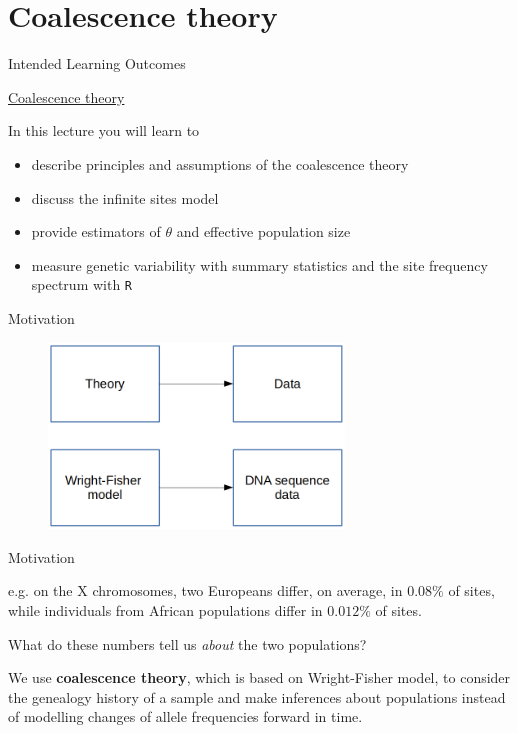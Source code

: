 
\section{Coalescence theory}

\begin{frame}{Intended Learning Outcomes}

        \underline{Coalescence theory}

	\bigskip

        In this lecture you will learn to
	\begin{itemize}
                \item describe principles and assumptions of the coalescence theory
                \item discuss the infinite sites model
                \item provide estimators of $\theta$ and effective population size
                \item measure genetic variability with summary statistics and the site frequency 
		spectrum with \texttt{R}
        \end{itemize}

\end{frame}


\begin{frame}{Motivation}

	\begin{figure}
                \includegraphics[width=0.7\textwidth]{Pics/data_theory}
        \end{figure}

\end{frame}


\begin{frame}{Motivation}

	e.g. on the X chromosomes, two Europeans differ, on average, in $0.08\%$ of sites, while
	individuals from African populations differ in $0.012\%$ of sites.

	\bigskip

	What do these numbers tell us \textit{about} the two populations?

	\pause

	\begin{block}{}
	We use \textbf{coalescence theory}, which is based on Wright-Fisher model, to consider the genealogy history
	of a sample and make inferences about populations instead of modelling changes of allele frequencies forward in time.
	\end{block}


\end{frame}


